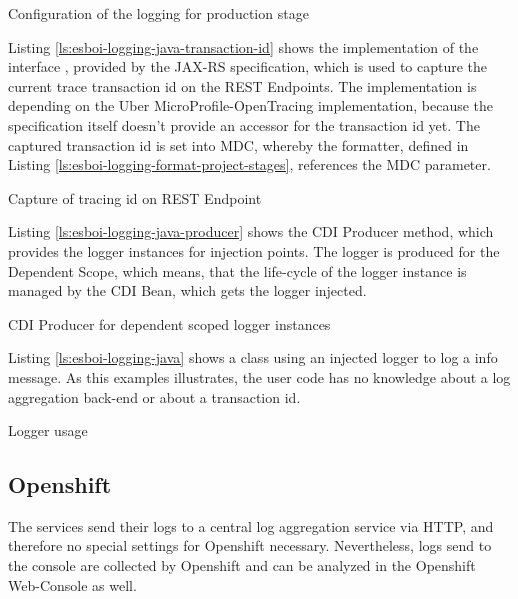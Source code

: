 \begin{listing}[h]
	\caption{Configuration of the logging for production stage}
	\label{ls:esboi-logging-prod-project-stages}
\end{listing}

Listing \vref{ls:esboi-logging-java-transaction-id} shows the implementation of the interface , provided by the JAX-RS specification, which is used to capture the current trace transaction id on the REST Endpoints. The implementation is depending on the Uber MicroProfile-OpenTracing implementation, because the specification itself doesn't provide an accessor for the transaction id yet. The captured transaction id is set into MDC, whereby the formatter, defined in Listing \vref{ls:esboi-logging-format-project-stages}, references the MDC parameter.
\newpage

\begin{listing}[h]
	\caption{Capture of tracing id on REST Endpoint}
	\label{ls:esboi-logging-java-transaction-id}
\end{listing} 

Listing \vref{ls:esboi-logging-java-producer} shows the CDI Producer method, which provides the logger instances for injection points. The logger is produced for the Dependent Scope, which means, that the life-cycle of the logger instance is managed by the CDI Bean, which gets the logger injected.

\begin{listing}[h]
	\caption{CDI Producer for dependent scoped logger instances}
	\label{ls:esboi-logging-java-producer}
\end{listing} 

Listing \vref{ls:esboi-logging-java} shows a class using an injected logger to log a info message. As this examples illustrates, the user code has no knowledge about a log aggregation back-end or about a transaction id.

\begin{listing}[h]
	\caption{Logger usage}
	\label{ls:esboi-logging-java}
\end{listing} 

\subsection{Openshift}
\label{sec:esbi-logging-openshift}
The services send their logs to a central log aggregation service via HTTP, and therefore no special settings for Openshift necessary. Nevertheless, logs send to the console are collected by Openshift and can be analyzed in the Openshift Web-Console as well.

